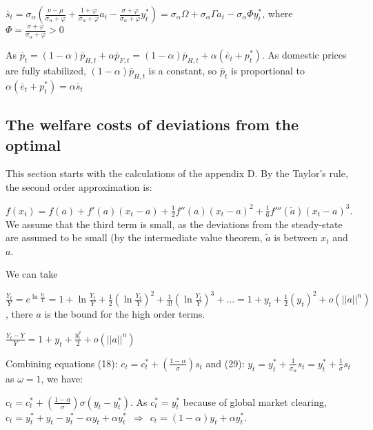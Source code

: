 \documentclass[
]{article}
\begin{document}
\(\displaystyle \overline{s}_t=\sigma_\alpha \left(\frac{\nu-\mu}{\sigma_\alpha+\varphi}+\frac{1+\varphi}{\sigma_\alpha+\varphi} a_t - \frac{\sigma +\varphi}{\sigma_\alpha+\varphi}y_t^* \right)=\sigma_\alpha \Omega+ \sigma_\alpha \Gamma a_t - \sigma_\alpha \Phi y_t^*\),
where
\(\displaystyle \Phi=\frac{\sigma+\varphi}{\sigma_\alpha+\varphi}>0\)

As
\(\overline{p}_t=(1-\alpha) \overline{p}_{H,t}+\alpha\overline{p}_{F,t} = (1-\alpha)\overline{p}_{H,t}+\alpha(\overline{e}_{t}+p_t^*)\).
As domestic prices are fully stabilized,
\((1-\alpha)\overline{p}_{H,t}\) is a constant, so \(\overline{p}_t\) is
proportional to
\(\alpha(\overline{e}_{t}+p_t^*) = \alpha \overline{s}_t\)

\hypertarget{the-welfare-costs-of-deviations-from-the-optimal}{%
\subsection{The welfare costs of deviations from the
optimal}\label{the-welfare-costs-of-deviations-from-the-optimal}}

This section starts with the calculations of the appendix D. By the
Taylor's rule, the second order approximation is:

\(\displaystyle f(x_t) = f(a) + f'(a)(x_t-a) + \frac{1}{2}f''(a)(x_t-a)^2 + \frac{1}{6}f'''(\widetilde{a})(x_t-a)^3\).
We assume that the third term is small, as the deviations from the
steady-state are assumed to be small (by the intermediate value theorem,
\(\widetilde{a}\) is between \(x_t\) and \(a\).

We can take

\(\displaystyle \frac{Y_t}{Y}=e^{\ln \frac{Y_t}{Y}}=1+\ln \frac{Y_t}{Y}+\frac{1}{2} \left( \ln \frac{Y_t}{Y} \right)^2 + \frac{1}{3!}\left( \ln \frac{Y_t}{Y} \right)^3 + ... = 1+y_t+\frac{1}{2} \left( y_t \right)^2+o(||a||^n)\),
there \(a\) is the bound for the high order terms.

\(\displaystyle \frac{Y_t-Y}{Y}= 1+y_t+\frac{y_t^2}{2} +o(||a||^n)\)

Combining equations (18):
\(\displaystyle c_t=c_t^*+ \left(\frac{1-\alpha}{\sigma} \right) s_t\)
and (29):
\(\displaystyle y_t = y_t^*+\frac{1}{\sigma_\alpha}s_t = y_t^*+\frac{1}{\sigma}s_t\)
as \(\omega=1\), we have:

\(\displaystyle c_t=c_t^*+\left( \frac{1-\alpha}{\sigma} \right)\sigma(y_t-y_t^*)\).
As \(c_t^*=y_t^*\) because of global market clearing,
\(c_t=y_t^* + y_t -y_t^* -\alpha y_t + \alpha y_t^* \ \ \Rightarrow \ \ c_t = (1-\alpha)y_t+\alpha y_t^*\).
\end{document}

